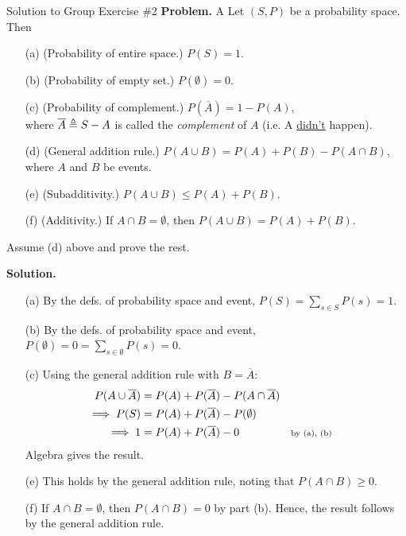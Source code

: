 \documentclass[10pt]{beamer}
\begin{document}
\begin{frame}{Solution to Group Exercise \#2}
\scriptsize  
 \colorbox{blue!30}{\textbf{Problem.}} A Let $(S,P)$ be a probability space. Then
\begin{itemize}
	\item[(a)] (Probability of entire space.) $P(S)=1$. 
	\item[(b)] (Probability of empty set.)  $P(\emptyset)=0$. 
	\item[(c)] (Probability of complement.) $P(\overline{A}) = 1-P(A)$, \\
		where $\overline{A} \triangleq S-A$ is called the \textit{complement} of $A$ (i.e. A \underline{didn't} happen).
	\item[(d)]  (General addition rule.)  $P(A \cup B) = P(A) + P(B) - P(A \cap B)$, \\
	where $A$ and $B$ be events.
	\item[(e)] (Subadditivity.) $P(A \cup B) \leq P(A) + P(B)$. 
	\item[(f)] (Additivity.) If $A \cap B = \emptyset$, then  $P(A \cup B) = P(A) + P(B)$.
\end{itemize}
Assume (d) above and prove the rest.

 \vfill
  \colorbox{green!30}{\textbf{Solution.}}
 \begin{itemize}
	\item[(a)]  By the defs. of probability space and event, $P(S)= \sum_{s \in S} P(s) = 1.$ 
	\item[(b)]  By the defs. of probability space and event,  $P(\emptyset)=0 = \sum_{s \in \emptyset} P(s) = 0$. 
	\item[(c)] Using the general addition rule with $B=\overline{A}$:
	\begin{align*}
	P(A \cup \overline{A}) &= P(A) + P(\overline{A}) - P(A \cap \overline{A}) \\
	\implies P(S) &= P(A) + P(\overline{A}) - P(\emptyset) \\
	\implies 1 &= P(A) + P(\overline{A}) - 0 && \text{\scriptsize{{by (a), (b)}}}
	\end{align*}
	Algebra gives the result.
	\item[(e)] This holds by the general addition rule, noting that $P(A \cap B) \geq 0$.
	\item[(f)] If $A \cap B = \emptyset$, then $P(A \cap B) =0$ by part (b).  Hence, the result follows by the general addition rule.
\end{itemize}

\end{frame}
\end{document}
